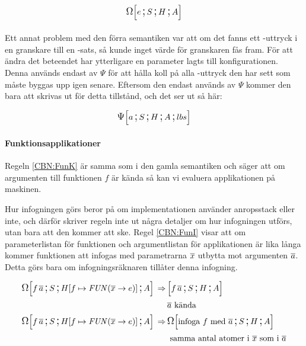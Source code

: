 \documentclass[../Optimise]{subfiles}
\begin{document}
\[
\CBNOMEGA SHAe
\]

\paragraph{}

Ett annat problem med den förra semantiken var att om det fanns ett -uttryck
i en granskare till en -sats, så kunde inget värde för granskaren fås fram.
För att ändra det beteendet har ytterligare en parameter lagts till konfigurationen.
Denna används endast av $\Psi$ för att hålla koll på alla -uttryck den har sett
som måste byggas upp igen senare. Eftersom den endast används av $\Psi$ kommer den bara
att skrivas ut för detta tillstånd, och det ser ut så här:

\[
\CBNPSI SHA{lbs}a
\]

\begin{comment}
En annan ändring är att $\Psi$ numera tar en atom istället för en variabel
eftersom det inte bara är variabler som kan vara värden. Detta var en detalj
som missades i CBV-semantiken men som nu har rättats till.
\end{comment}

\paragraph{Funktionsapplikationer}
Regeln \eqref{CBN:FunK} är samma som i den gamla semantiken och säger att om argumenten till funktionen $f$ är kända
så kan vi evaluera applikationen på maskinen. 

Hur infogningen görs beror på om implementationen använder anropsstack eller inte, och därför 
skriver regeln inte ut några detaljer om hur infogningen utförs, utan bara att den kommer att ske. 
Regel \eqref{CBN:FunI} visar att om parameterlistan för funktionen och argumentlistan för applikationen är
lika långa kommer funktionen att infogas med parametrarna $\many{x}$ utbytta mot
argumenten $\many{a}$. Detta görs bara om infogningsräknaren tillåter denna infogning.


\begin{align}
\label{CBN:FunK}\CBNOMEGA S{\heap f{\FUN{\many{x}}{e}}}A{f \, \many{a}} \rulesep & \CBNMC {f \, \many{a}}SHA \\
 & \many{a} \text{ kända } \nonumber \\
\label{CBN:FunI}\CBNOMEGA S{\heap f{\FUN{\many{x}}e}}A{f\, \many{a}} \rulesep & \CBNOMEGA SHA{\text{infoga } f \text{ med } \many{a}} \\
 & \text{ samma antal atomer i } \many{x} \text{ som i } \many{a} \nonumber
\end{align}
\end{document}
